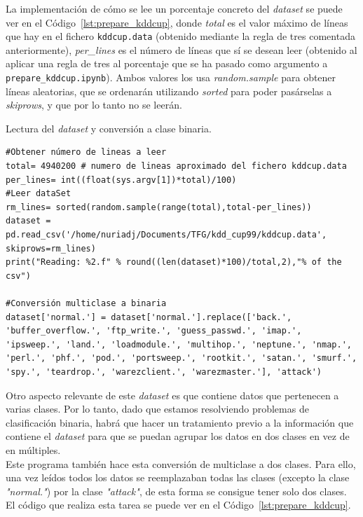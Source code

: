 \documentclass[a4paper, 12pt]{book}
\begin{document}
La implementación de cómo se lee un porcentaje concreto del \textit{dataset} se puede ver en el Código~\ref{lst:prepare_kddcup}, donde \textit{total} es el valor máximo de líneas que hay en el fichero \texttt{kddcup.data} (obtenido mediante la regla de tres comentada anteriormente), \textit{per\_lines} es el número de líneas que sí se desean leer (obtenido al aplicar una regla de tres al porcentaje que se ha pasado como argumento a \texttt{prepare\_kddcup.ipynb}). Ambos valores los usa \textit{random.sample} para obtener líneas aleatorias, que se ordenarán utilizando \textit{sorted} para poder pasárselas a \textit{skiprows}, y que por lo tanto no se leerán.

\begin{listing}[htb]
    \caption{Lectura del \textit{dataset} y conversión a clase binaria.}{}
    \label{lst:prepare_kddcup}
    \begin{verbatim}
#Obtener número de lineas a leer
total= 4940200 # numero de lineas aproximado del fichero kddcup.data
per_lines= int((float(sys.argv[1])*total)/100)
#Leer dataSet
rm_lines= sorted(random.sample(range(total),total-per_lines))
dataset = pd.read_csv('/home/nuriadj/Documents/TFG/kdd_cup99/kddcup.data', skiprows=rm_lines)
print("Reading: %2.f" % round((len(dataset)*100)/total,2),"% of the csv")

#Conversión multiclase a binaria
dataset['normal.'] = dataset['normal.'].replace(['back.', 'buffer_overflow.', 'ftp_write.', 'guess_passwd.', 'imap.', 'ipsweep.', 'land.', 'loadmodule.', 'multihop.', 'neptune.', 'nmap.', 'perl.', 'phf.', 'pod.', 'portsweep.', 'rootkit.', 'satan.', 'smurf.', 'spy.', 'teardrop.', 'warezclient.', 'warezmaster.'], 'attack')
    \end{verbatim}
\end{listing}

Otro aspecto relevante de este \textit{dataset} es que contiene datos que pertenecen a varias clases. Por lo tanto, dado que estamos resolviendo problemas de clasificación binaria, habrá que hacer un tratamiento previo a la información que contiene el \textit{dataset} para que se puedan agrupar los datos en dos clases en vez de en múltiples.\\
Este programa también hace esta conversión de multiclase a dos clases. Para ello, una vez leídos todos los datos se reemplazaban todas las clases (excepto la clase \textit{"normal."}) por la clase \textit{"attack"}\cite{MulticlassToBinary}, de esta forma se consigue tener solo dos clases. El código que realiza esta tarea se puede ver en el Código~\ref{lst:prepare_kddcup}.
\end{document}
